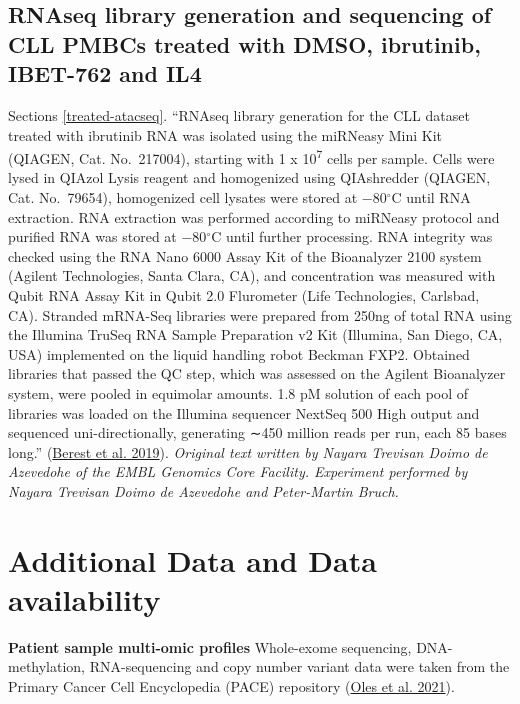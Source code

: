 \documentclass[11pt, a4paper, twosided]{book}
\begin{document}
\hypertarget{rnaseq-library-generation-and-sequencing-of-cll-pmbcs-treated-with-dmso-ibrutinib-ibet-762-and-il4}{%
\subsection{RNAseq library generation and sequencing of CLL PMBCs treated with DMSO, ibrutinib, IBET-762 and IL4}\label{rnaseq-library-generation-and-sequencing-of-cll-pmbcs-treated-with-dmso-ibrutinib-ibet-762-and-il4}}

Sections \ref{treated-atacseq}. ``RNAseq library generation for the CLL dataset treated with ibrutinib
RNA was isolated using the miRNeasy Mini Kit (QIAGEN, Cat. No.~217004), starting with 1 x 10\textsuperscript{7} cells per sample. Cells were lysed in QIAzol Lysis reagent and homogenized using QIAshredder (QIAGEN, Cat. No.~79654), homogenized cell lysates were stored at −80\(^\circ\)C until RNA extraction. RNA extraction was performed according to miRNeasy protocol and purified RNA was stored at −80\(^\circ\)C until further processing. RNA integrity was checked using the RNA Nano 6000 Assay Kit of the Bioanalyzer 2100 system (Agilent Technologies, Santa Clara, CA), and concentration was measured with Qubit RNA Assay Kit in Qubit 2.0 Flurometer (Life Technologies, Carlsbad, CA). Stranded mRNA-Seq libraries were prepared from 250ng of total RNA using the Illumina TruSeq RNA Sample Preparation v2 Kit (Illumina, San Diego, CA, USA) implemented on the liquid handling robot Beckman FXP2. Obtained libraries that passed the QC step, which was assessed on the Agilent Bioanalyzer system, were pooled in equimolar amounts. 1.8 pM solution of each pool of libraries was loaded on the Illumina sequencer NextSeq 500 High output and sequenced uni-directionally, generating ∼450 million reads per run, each 85 bases long.'' (\protect\hyperlink{ref-Berest2019}{Berest et al. 2019}). \emph{Original text written by Nayara Trevisan Doimo de Azevedohe of the EMBL Genomics Core Facility. Experiment performed by Nayara Trevisan Doimo de Azevedohe and Peter-Martin Bruch.}

\hypertarget{additional-data-and-data-availability}{%
\section{Additional Data and Data availability}\label{additional-data-and-data-availability}}

\textbf{Patient sample multi-omic profiles} Whole-exome sequencing, DNA-methylation, RNA-sequencing and copy number variant data were taken from the Primary Cancer Cell Encyclopedia (PACE) repository (\protect\hyperlink{ref-R-BloodCancerMultiOmics2017}{Oles et al. 2021}).
\end{document}
